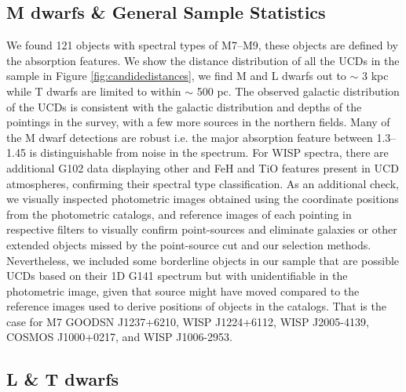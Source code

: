 \documentclass[manuscript]{aastex63}
\begin{document}
\subsection{M dwarfs \& General Sample Statistics}
We found 121 objects with spectral types of M7--M9, these objects are defined by the \wat absorption features. We show the distance distribution of all the UCDs in the sample in Figure \ref{fig:candidedistances}, we find M and L dwarfs out to $\sim$ 3 kpc while T dwarfs are limited to within $\sim$ 500 pc. The observed galactic distribution of the UCDs is consistent with the galactic distribution and depths of the pointings in the survey, with a few more sources in the northern fields. Many of the M dwarf detections are robust i.e. the major \wat absorption feature between 1.3--1.45 \micron is distinguishable from noise in the spectrum. For WISP spectra, there are additional G102 data displaying other \wat and FeH and TiO features present in UCD atmospheres, confirming their spectral type classification. As an additional check, we visually inspected photometric images obtained using the coordinate positions from the photometric catalogs, and reference images of each pointing in respective filters to visually confirm point-sources and eliminate galaxies or other extended objects missed by the point-source cut and our selection methods. Nevertheless, we included some borderline objects in our sample that are possible UCDs based on their 1D G141 spectrum but with unidentifiable in the photometric image, given that source might have moved compared to the reference images used to derive positions of objects in the catalogs. That is the case for M7 GOODSN J1237+6210,  WISP J1224+6112, WISP J2005-4139, COSMOS J1000+0217, and WISP J1006-2953.

\subsection{ L \& T dwarfs}
\end{document}
